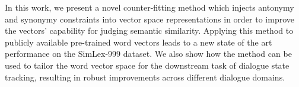 In this work, we present a novel counter-fitting method which injects antonymy and synonymy constraints into vector space representations in order to improve the vectors' capability for judging semantic similarity. Applying this method to publicly available pre-trained word vectors leads to a new state of the art performance on the SimLex-999 dataset. We also show how the method can be used to tailor the word vector space for the downstream task of dialogue state tracking, resulting in robust improvements across different dialogue domains.
